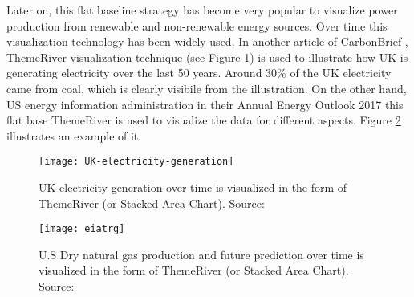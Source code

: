 Later on, this flat baseline strategy has become very popular to visualize power production from renewable and non-renewable energy sources. Over time this visualization technology has been widely used. In another article of CarbonBrief \cite{cbuk2016}, ThemeRiver visualization technique (see Figure \ref{fig:ukecg}) is used to illustrate how UK is generating electricity over the last 50 years. Around 30\% of the UK electricity came from coal, which is clearly visibile from the illustration. On the other hand, US energy information administration in their Annual Energy Outlook 2017 \cite{eiagov} this flat base ThemeRiver is used to visualize the data for different aspects. Figure \ref{fig:eiatrgh} illustrates an example of it. 

\begin{figure}
  \begin{center}
    \texttt{[image: UK-electricity-generation]}
    \caption{UK electricity generation over time is visualized in the form of ThemeRiver (or Stacked Area Chart). Source:\cite{cbuk2016}}
    \label{fig:ukecg}
  \end{center}
\end{figure}

\begin{figure} [H]
  \begin{center}
    \texttt{[image: eiatrg]}
    \caption{U.S Dry natural gas production and future prediction over time is visualized in the form of ThemeRiver (or Stacked Area Chart). Source:\cite{eiagov}}
    \label{fig:eiatrgh}
  \end{center}
\end{figure}



